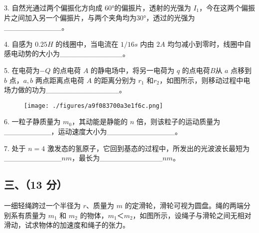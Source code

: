 3. 自然光通过两个偏振化方向成 60°的偏振片，透射的光强为 $I_1$，今在这两个偏振片之间加入另一个偏振片，与两个夹角均为30°，透过的光强为___________。

4. 自感为 $0.25H$ 的线圈中，当电流在 $1/16s$ 内由 $2A$ 均匀减小到零时，线圈中自感电动势的大小为____________。

5. 在电荷为$-Q$ 的点电荷 $A$ 的静电场中，将另一电荷为 $q$ 的点电荷$B$从 $a$ 点移到 $b$ 点，$a,b$ 两点距离点电荷 $A$ 的距离分别为 $r_1$ 和$r_2$，如图所示，则移动过程中电场力做的功为______________。
\begin{figure}[ht]
\centering
\texttt{[image: ./figures/a9f083700a3e1f6c.png]}
\caption{} \label{fig_NJUD3_2}
\end{figure}
6. 一粒子静质量为 $m_0$，其动能是静能的 $n$ 倍，则该粒子的运动质量为_________，运动速度大小为_____________。

7. 处于 $n=4$ 激发态的氢原子，它回到基态的过程中，所发出的光波波长最短为___________$nm$，最长为____________$nm$。
\subsection{三、（13 分）}
一细轻绳跨过一个半径为 $r$、质量为 $m$ 的定滑轮，滑轮可视为圆盘。绳的两端分别系有质量为 $m_1$ 和 $m_2$ 的物体，$m_1＜m_2$，如图所示，设绳子与滑轮之间无相对滑动，试求物体的加速度和绳子的张力。